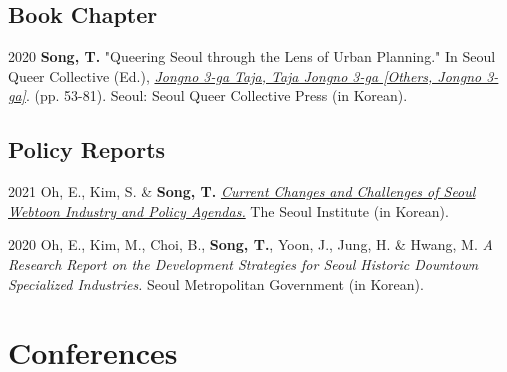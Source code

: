 \documentclass[12pt,letterpaper]{report}
\begin{document}
    \subsection*{Book Chapter}
    \begin{tablist}
        \item[2020] \tab{}\textbf{Song, T.} "Queering Seoul through the Lens of Urban Planning." In Seoul Queer Collective (Ed.), \emph{\href{http://www.kyobobook.co.kr/product/detailViewKor.laf?ejkGb=KOR&mallGb=KOR&barcode=9791197096501}{Jongno 3-ga Taja, Taja Jongno 3-ga [Others, Jongno 3-ga]}}. (pp. 53-81). Seoul: Seoul Queer Collective Press (in Korean).
    \end{tablist}
    \subsection*{Policy Reports}
    \begin{tablist}
        \item[2021] \tab{}Oh, E., Kim, S. \& \textbf{Song, T.} \emph{\href{http://global.si.re.kr/content/current-changes-and-challenges-seoul-webtoon-industry-and-policy-agendas}{Current Changes and Challenges of Seoul Webtoon Industry and Policy Agendas.}} The Seoul Institute (in Korean).
        \item[2020] \tab{}Oh, E., Kim, M., Choi, B., \textbf{Song, T.}, Yoon, J., Jung, H. \& Hwang, M. \emph{A Research Report on the Development Strategies for Seoul Historic Downtown Specialized Industries.} Seoul Metropolitan Government (in Korean).
    \end{tablist}
    
    \section*{Conferences}
\end{document}
